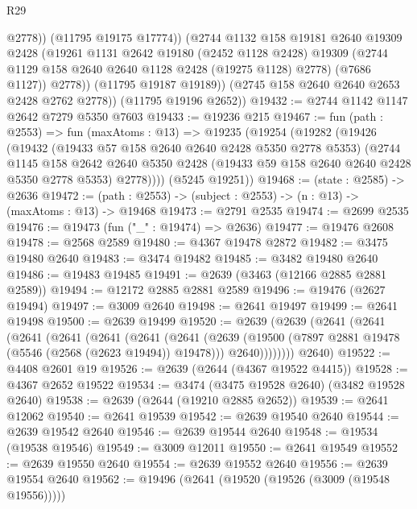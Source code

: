 \begin{lexlean}{R29}
\begin{coremodule}
                  @2778))
              (@11795 @19175 @17774))
            (@2744
              @1132
              @158
              @19181
              @2640
              @19309
              @2428
              (@19261
                @1131
                @2642
                @19180
                (@2452 @1128 @2428)
                @19309
                (@2744 @1129 @158 @2640 @2640 @1128 @2428 (@19275 @1128) @2778)
                (@7686 @1127))
              @2778))
          (@11795 @19187 @19189))
        (@2745 @158 @2640 @2640 @2653 @2428 @2762 @2778))
      (@11795 @19196 @2652))
@19432 := @2744 @1142 @1147 @2642 @7279 @5350 @7603
@19433 := @19236 @215
@19467 := fun (path : @2553) =>
  fun (maxAtoms : @13) =>
  @19235
    (@19254
      (@19282
        (@19426
          (@19432
            (@19433 @57 @158 @2640 @2640 @2428 @5350 @2778 @5353)
            (@2744
              @1145
              @158
              @2642
              @2640
              @5350
              @2428
              (@19433 @59 @158 @2640 @2640 @2428 @5350 @2778 @5353)
              @2778))))
      (@5245 @19251))
@19468 := (state : @2585) -> @2636
@19472 := (path : @2553) -> (subject : @2553) -> (n : @13) -> (maxAtoms : @13) -> @19468
@19473 := @2791 @2535
@19474 := @2699 @2535
@19476 := @19473 (fun ("_" : @19474) => @2636)
@19477 := @19476 @2608
@19478 := @2568 @2589
@19480 := @4367 @19478 @2872
@19482 := @3475 @19480 @2640
@19483 := @3474 @19482
@19485 := @3482 @19480 @2640
@19486 := @19483 @19485
@19491 := @2639 (@3463 (@12166 @2885 @2881 @2589))
@19494 := @12172 @2885 @2881 @2589
@19496 := @19476 (@2627 @19494)
@19497 := @3009 @2640
@19498 := @2641 @19497
@19499 := @2641 @19498
@19500 := @2639 @19499
@19520 := @2639
    (@2639
      (@2641
        (@2641
          (@2641
            (@2641
              (@2641
                (@2641
                  (@2641
                    (@2639
                      (@19500 (@7897 @2881 @19478 (@5546 (@2568 (@2623 @19494)) @19478)))
                      @2640))))))))
      @2640)
@19522 := @4408 @2601 @19
@19526 := @2639 (@2644 (@4367 @19522 @4415))
@19528 := @4367 @2652 @19522
@19534 := @3474 (@3475 @19528 @2640) (@3482 @19528 @2640)
@19538 := @2639 (@2644 (@19210 @2885 @2652))
@19539 := @2641 @12062
@19540 := @2641 @19539
@19542 := @2639 @19540 @2640
@19544 := @2639 @19542 @2640
@19546 := @2639 @19544 @2640
@19548 := @19534 (@19538 @19546)
@19549 := @3009 @12011
@19550 := @2641 @19549
@19552 := @2639 @19550 @2640
@19554 := @2639 @19552 @2640
@19556 := @2639 @19554 @2640
@19562 := @19496 (@2641 (@19520 (@19526 (@3009 (@19548 @19556)))))

\end{coremodule}
\end{lexlean}
